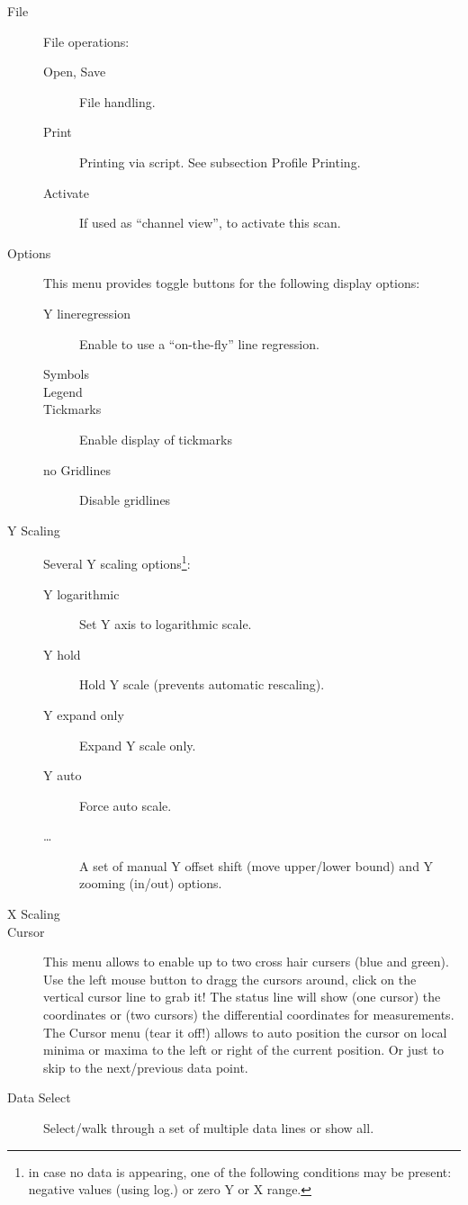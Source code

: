 \begin{description}
\item[File] File operations:
\begin{description}
\item[Open, Save] File handling.
\item[Print] Printing via script. See subsection Profile Printing.
\item[Activate] If used as ``channel view'', to activate this scan.
\end{description}
\item[Options] This menu provides toggle buttons for the following display options:\\
  \begin{description}
  \item[Y lineregression] Enable to use a ``on-the-fly'' line regression.
  \item[Symbols] \GxsmNA
  \item[Legend] \GxsmNA
  \item[Tickmarks] Enable display of tickmarks
  \item[no Gridlines] Disable gridlines
  \end{description}
\item[Y Scaling] Several Y scaling options\footnote{ in case
    no data is appearing, one of the following conditions may be
    present: negative values (using log.) or zero Y or X range.}:
  \begin{description}
  \item[Y logarithmic] Set Y axis to logarithmic scale.
  \item[Y hold] Hold Y scale (prevents automatic rescaling).
  \item[Y expand only] Expand Y scale only.
  \item[Y auto] Force auto scale.
  \item[\dots] A set of manual Y offset shift (move upper/lower bound) 
    and Y zooming (in/out) options.
  \end{description}
\item[X Scaling] \GxsmNA
\item[Cursor] This menu allows to enable up to two cross hair
cursers (blue and green). Use the left mouse button to dragg the
cursors around, click on the vertical cursor line to grab it! The
status line will show (one cursor) the coordinates or (two
cursors) the differential coordinates for measurements.\\
The Cursor menu (tear it off!) allows to auto position the cursor on
local minima or maxima to the left or right of the current position.
Or just to skip to the next/previous data point.
\item[Data Select] Select/walk through a set of multiple data lines or show all.\\
\end{description}



